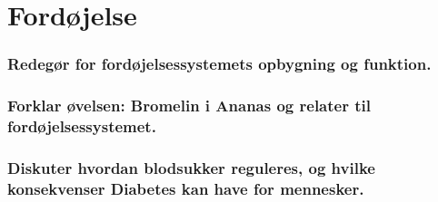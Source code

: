 \newpage
\part{Fordøjelse}
\section{Redegør for fordøjelsessystemets opbygning og funktion.}
\section{Forklar øvelsen: Bromelin i Ananas og relater til fordøjelsessystemet.}
\section{Diskuter hvordan blodsukker reguleres, og hvilke konsekvenser Diabetes kan have for mennesker.}